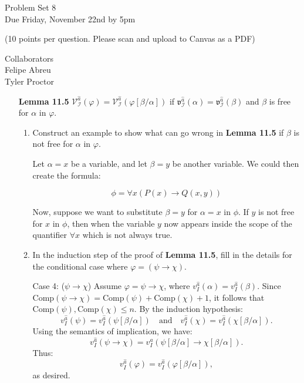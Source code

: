 \documentclass[12pt]{article}
\newcommand{\I}{\mathcal{I}} %
\newcommand{\VV}[2]{\mathcal{V}_{#1}^{#2}} %
\newcommand{\val}[2]{\mathfrak{v}_{#1}^{#2}} %
\newcommand{\va}[1]{\hat{#1}} %
\newcommand{\unisub}[2]{[#1/#2]}
\newcommand{\answer}[1]{%
  \par\noindent
  \begin{tcolorbox}[colback=gray!10, colframe=gray!80, title=Proof]
    #1
  \end{tcolorbox}
}
\begin{document}
\thispagestyle{empty}

\begin{center}
  \Large Problem Set 8\\[1ex] 
  Due Friday, November 22nd by 5pm
  \vspace{.15in}

  \normalsize{(10 points per question. Please scan and upload to Canvas as a PDF)}\\[3ex] 
\end{center}

Collaborators \\
Felipe Abreu\\
Tyler Proctor\\


\begin{itemize}[leftmargin=1.5in]
  \item[\bf Lemma 11.5] $\VV{\I}{\va{a}}(\varphi) = \VV{\I}{\va{a}}(\varphi\unisub{\beta}{\alpha})$ if $\val{\I}{\va{a}}(\alpha) = \val{\I}{\va{a}}(\beta)$ and $\beta$ is free for $\alpha$ in $\varphi$.
    \begin{enumerate}[leftmargin=-.5in]
      \item Construct an example to show what can go wrong in \textbf{Lemma 11.5} if $\beta$ is not free for $\alpha$ in $\varphi$.
        \answer{
          Let \( \alpha = x \) be a variable, and let \( \beta = y \) be another variable. We could then create the formula:

          \[
          \phi = \forall x (P(x) \rightarrow Q(x, y))
          \]

          Now, suppose we want to substitute \( \beta = y \) for \( \alpha = x \) in \( \phi \).
          If \( y \) is not free for \( x \) in \( \phi \), then when the variable \( y \) now appears inside the scope
          of the quantifier \( \forall x \) which is not always true.

        }
      \item In the induction step of the proof of \textbf{Lemma 11.5}, fill in the details for the conditional case where $\varphi=(\psi\rightarrow\chi)$.
        \answer{
          Case 4: (\( \psi \to \chi \))
          Assume \( \varphi = \psi \to \chi \), where \( v_I^{\hat{a}}(\alpha) = v_I^{\hat{a}}(\beta) \).  
          Since \( \text{Comp}(\psi \to \chi) = \text{Comp}(\psi) + \text{Comp}(\chi) + 1 \), it follows that \( \text{Comp}(\psi), \text{Comp}(\chi) \leq n \).  
          By the induction hypothesis:
          \[
          v_I^{\hat{a}}(\psi) = v_I^{\hat{a}}(\psi[\beta/\alpha]) \quad \text{and} \quad v_I^{\hat{a}}(\chi) = v_I^{\hat{a}}(\chi[\beta/\alpha]).
          \]
          Using the semantics of implication, we have:
          \[
          v_I^{\hat{a}}(\psi \to \chi) = v_I^{\hat{a}}(\psi[\beta/\alpha] \to \chi[\beta/\alpha]).
          \]
          Thus:
          \[
          v_I^{\hat{a}}(\varphi) = v_I^{\hat{a}}(\varphi[\beta/\alpha]),
          \]
          as desired.
        }
        

\end{enumerate}
\end{itemize}
\end{document}
